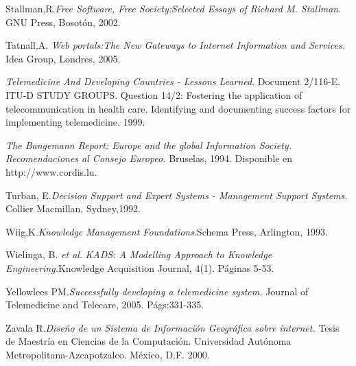 \begin{thebibliography}{}
 Stallman,R.\textit{Free Software, Free Society:Selected Essays of Richard M. Stallman}. GNU Press, Bosotón, 2002.

 Tatnall,A. \textit{Web portals:The New Gateways to Internet Information and Services.} Idea Group, Londres, 2005.

 \textit{Telemedicine And Developing Countries - Lessons Learned}. Document 2/116-E. ITU-D STUDY GROUPS. Question 14/2: Fostering the application of telecommunication in health care.  Identifying and documenting success factors for implementing telemedicine. 1999.

 \textit{The Bangemann Report: Europe and the global Information Society. Recomendaciones al Consejo Europeo.} Bruselas, 1994. Disponible en http://www.cordis.lu.

 Turban, E.\textit{Decision Support and Expert Systems - Management Support Systems.} Collier Macmillan, Sydney,1992.

 Wiig,K.\textit{Knowledge Management Foundations}.Schema Press, Arlington, 1993. 

 Wielinga, B. \textit{et al}. \textit{KADS: A Modelling Approach to Knowledge Engineering.}Knowledge Acquisition Journal, 4(1). Páginas 5-53.

 Yellowlees PM.\textit{Successfully developing a telemedicine system.} Journal of Telemedicine and Telecare, 2005. Págs:331-335.

 Zavala R.\textit{Diseño de un Sistema de Información Geográfica sobre internet.} Tesis de Maestría en Ciencias de la Computación. Universidad Autónoma Metropolitana-Azcapotzalco. México, D.F. 2000.

\end{thebibliography}
